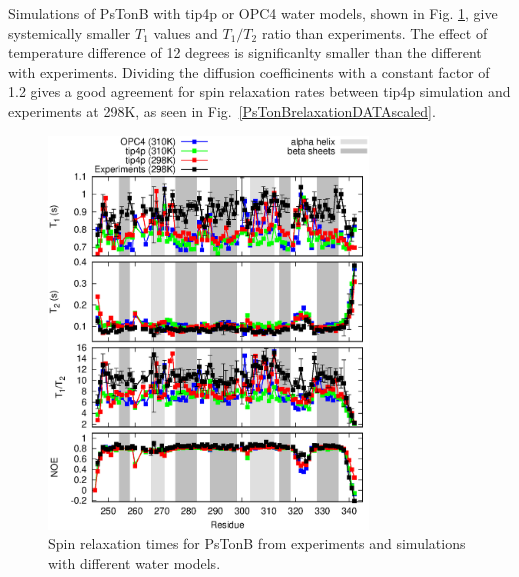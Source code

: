 \documentclass[pre,aps,floatfix,authordate1-4,twocolumn]{revtex4-1}
\begin{document}
Simulations of PsTonB with tip4p or OPC4 water models,
shown in Fig. \ref{PsTonBrelaxationDATA}, give systemically
smaller $T_1$ values and $T_1/T_2$ ratio than experiments.
The effect of temperature difference of 12 degrees is significanlty
smaller than the different with experiments. Dividing the diffusion
coefficinents with a constant factor of 1.2 gives a good agreement for
spin relaxation rates between tip4p simulation and experiments at 298K,
as seen in Fig.~\ref{PsTonBrelaxationDATAscaled}.
\begin{figure}[!h]
  \includegraphics[width=8.5cm]{../Figs/PsTonBrelaxationDATA.eps}%
  \caption{Spin relaxation times for PsTonB from experiments \cite{??}
    and simulations with different water models. 
    \label{PsTonBrelaxationDATA}}%
\end{figure}
\end{document}
